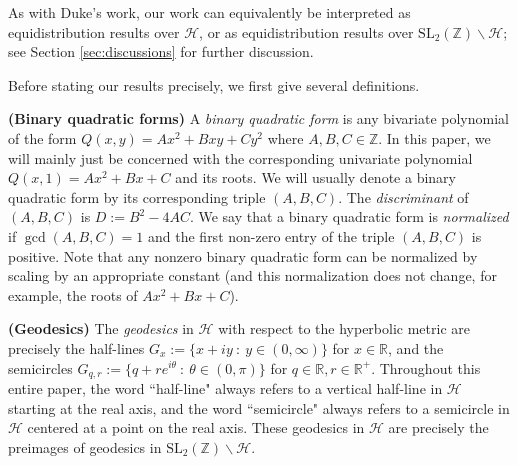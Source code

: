 \documentclass[11pt,letterpaper,reqno]{amsart}
\numberwithin{equation}{section}
\numberwithin{figure}{section}
\numberwithin{table}{section}
\newcommand{\ZZ}{\mathbb{Z}}
\newcommand{\RR}{\mathbb{R}}
\newcommand{\SL}{\text{SL}}
\newcommand{\HH}{\mathcal{H}}
\begin{document}
As with Duke's work, our work can equivalently be interpreted as equidistribution results over $\HH$, or as equidistribution results over $\SL_2(\ZZ)\backslash\HH$; see Section \ref{sec:discussions} for further discussion.


Before stating our results precisely, we first give several definitions.

\textbf{(Binary quadratic forms)}  
A \textit{binary quadratic form} is any bivariate polynomial of the form $Q(x,y) = Ax^2+Bxy+Cy^2$ where $A,B,C \in \ZZ$. 
In this paper, we will mainly just be concerned with the corresponding univariate polynomial $Q(x,1) = Ax^2+Bx+C$ and its roots.
We will usually denote a binary quadratic form by its corresponding triple $(A,B,C)$. 
The \textit{discriminant} of $(A,B,C)$ is $D := B^2-4AC$. We say that a binary quadratic form is \textit{normalized} if $\gcd(A,B,C)=1$ and the first non-zero entry of the triple $(A,B,C)$ is positive. Note that any nonzero binary quadratic form can be normalized by scaling by an appropriate constant (and this normalization does not change, for example, the roots of $Ax^2 + Bx + C$).


\textbf{(Geodesics)} The \textit{geodesics} in $\HH$ with respect to the hyperbolic metric are precisely the half-lines $G_x :=\{x+iy ~:~ y \in (0,\infty)\}$ for $x \in \RR$, and the semicircles $G_{q,r} := \{q + re^{i\theta} ~:~ \theta \in (0,\pi)\}$ for $q\in\RR,r\in \RR^+$. Throughout this entire paper, the word ``half-line" always refers to a vertical half-line in $\HH$ starting at the real axis, and the word ``semicircle" always refers to a semicircle in $\HH$ centered at a point on the real axis.
These geodesics in $\HH$ are precisely the preimages of geodesics in $\SL_2(\ZZ)\backslash\HH$. 
\end{document}
